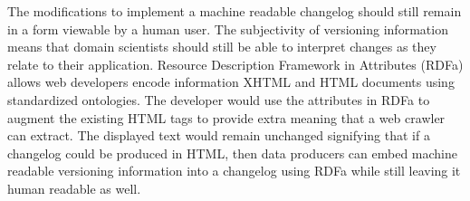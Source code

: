 The modifications to implement a machine readable changelog should still remain in a form viewable by a human user.
The subjectivity of versioning information means that domain scientists should still be able to interpret changes as they relate to their application.
Resource Description Framework in Attributes (RDFa) allows web developers encode information XHTML and HTML documents using standardized ontologies.
The developer would use the attributes in RDFa to augment the existing HTML tags to provide extra meaning that a web crawler can extract.
The displayed text would remain unchanged signifying that if a changelog could be produced in HTML, then data producers can embed machine readable versioning information into a changelog using RDFa while still leaving it human readable as well.


